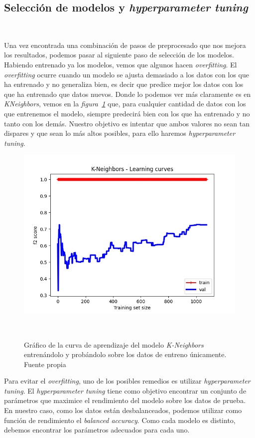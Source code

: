 \subsection{Selección de modelos y \textit{hyperparameter tuning}}\ \label{sec:entrenamiento}

Una vez encontrada una combinación de pasos de preprocesado que nos mejora los resultados, podemos pasar al siguiente paso de selección de los modelos. Habiendo entrenado ya los modelos, vemos que algunos hacen \textit{overfitting}. El \textit{overfitting} ocurre cuando un modelo se ajusta demasiado a los datos con los que ha entrenado y no generaliza bien, es decir que predice mejor los datos con los que ha entrenado que datos nuevos. Donde lo podemos ver más claramente es en \textit{KNeighbors}, vemos en la \textit{figura\ \ref{fig:lc-knn}} que, para cualquier cantidad de datos con los que entrenemos el modelo, siempre predecirá bien con los que ha entrenado y no tanto con los demás. Nuestro objetivo es intentar que ambos valores no sean tan dispares y que sean lo más altos posibles, para ello haremos \textit{hyperparameter tuning}.

\begin{figure}[!h]
    \centering
    \includegraphics[width=0.7\linewidth]{media/images/learing-curves-knn.png}
    \caption{Gráfico de la curva de aprendizaje del modelo \textit{K-Neighbors} entrenándolo y probándolo sobre los datos de entreno únicamente. Fuente propia}\ \label{fig:lc-knn}
\end{figure}

Para evitar el \textit{overfitting}, uno de los posibles remedios es utilizar \textit{hyperparameter tuning}. El \textit{hyperparameter tuning} tiene como objetivo encontrar un conjunto de parámetros que maximice el rendimiento del modelo sobre los datos de prueba. En nuestro caso, como los datos están desbalanceados, podemos utilizar como función de rendimiento el \textit{balanced accuracy}. Como cada modelo es distinto, debemos encontrar los parámetros adecuados para cada uno. 

